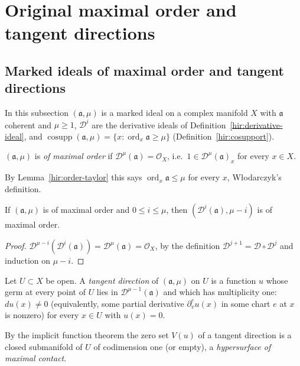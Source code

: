 \section{Original maximal order and tangent directions}
\label{sec:maximal-contact}

\subsection{Marked ideals of maximal order and tangent directions}

In this subsection \((\mathfrak a,\mu)\) is a marked ideal on a complex manifold \(X\) with \(\mathfrak a\) coherent and \(\mu\ge1\),
\(\mathcal D^i\) are the derivative ideals of Definition~\ref{hir:derivative-ideal}, and
\(\operatorname{cosupp}(\mathfrak a,\mu)=\{x:\operatorname{ord}_x\mathfrak a\ge\mu\}\) (Definition~\ref{hir:cosupport}).

\begin{definition}
\label{mc:maximal-order}
\leanok
\((\mathfrak a,\mu)\) is \emph{of maximal order} if \(\mathcal D^\mu(\mathfrak a)=\mathcal O_X\), i.e.\ \(1\in\mathcal D^\mu(\mathfrak a)_x\) for every
\(x\in X\).
\end{definition}
By Lemma~\ref{hir:order-taylor} this says \(\operatorname{ord}_x\mathfrak a\le\mu\) for every \(x\), Włodarczyk's definition.

\begin{lemma}
\label{mc:maximal-order-derivative}
\leanok
If \((\mathfrak a,\mu)\) is of maximal order and \(0\le i\le\mu\), then \((\mathcal D^i(\mathfrak a),\mu-i)\) is of maximal order.
\end{lemma}
\begin{proof}
\leanok
\(\mathcal D^{\mu-i}(\mathcal D^i(\mathfrak a))=\mathcal D^\mu(\mathfrak a)=\mathcal O_X\), by the definition \(\mathcal D^{j+1}=\mathcal D\circ\mathcal D^j\) and induction on
\(\mu-i\).
\end{proof}

\begin{definition}
\label{mc:tangent-direction}
\leanok
Let \(U\subset X\) be open. A \emph{tangent direction} of \((\mathfrak a,\mu)\) on \(U\) is a function \(u\) whose germ at every
point of \(U\) lies in \(\mathcal D^{\mu-1}(\mathfrak a)\) and which has multiplicity one: \(du(x)\ne0\) (equivalently, some partial
derivative \(\partial^e_vu(x)\) in some chart \(e\) at \(x\) is nonzero) for every \(x\in U\) with \(u(x)=0\).
\end{definition}
By the implicit function theorem the zero set \(V(u)\) of a tangent direction is a closed submanifold of \(U\) of codimension
one (or empty), a \emph{hypersurface of maximal contact}.

